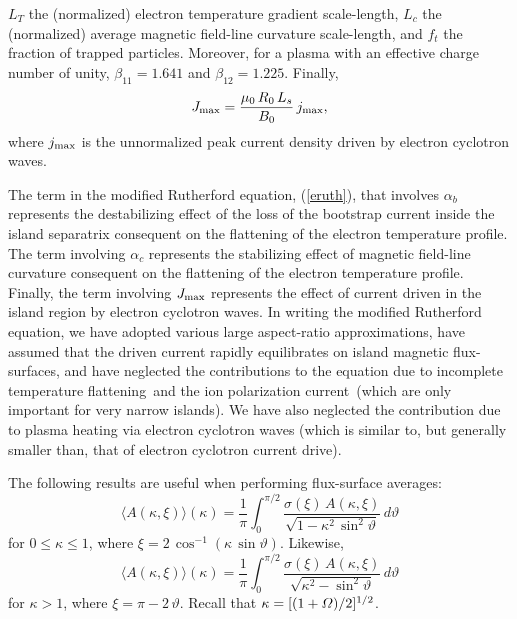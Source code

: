 \documentclass[12pt,prb,aps]{revtex4-1}
\begin{document}
$L_T$ the (normalized) electron temperature gradient scale-length, $L_c$ the (normalized) average magnetic field-line curvature scale-length, and $f_t$  the fraction of trapped particles. Moreover, for a plasma with an effective charge
number of unity, $\beta_{11}=1.641$ and $\beta_{12}= 1.225$.\cite{fitz}
Finally,
\begin{equation}\label{ecur}
J_{\rm max} = \frac{\mu_0\,R_0\,L_s}{B_0}\,j_{\rm max},
\end{equation}
where $j_{\rm max}$ is the unnormalized peak current density driven by electron cyclotron waves.  
 
 The term in the modified Rutherford equation, (\ref{eruth}),  that involves $\alpha_b$  represents  the
 destabilizing effect of the loss of the bootstrap current inside the island separatrix consequent on the flattening of the electron temperature profile. \cite{ntm2,car} The term involving $\alpha_c$ represents  the stabilizing effect of  magnetic field-line curvature  consequent on the flattening of the electron temperature profile.\cite{fitz,kot} Finally, the term involving $J_{\rm max}$ represents the effect of current driven in the island region by electron cyclotron waves.\cite{island} In writing the modified
 Rutherford equation, we have adopted various large aspect-ratio approximations,\cite{ggj1,fitz} have assumed that the driven current rapidly equilibrates on
 island magnetic flux-surfaces, 
and have  neglected the contributions to the equation due to incomplete temperature flattening\,\cite{ntm2} and the ion polarization current\,\cite{polz} (which are only important for
 very narrow islands). We  have also neglected the contribution due to
 plasma heating via electron cyclotron waves (which is similar to, but generally smaller than, that of electron cyclotron current drive).\cite{ntm4,island}
 
 The following results are useful when performing flux-surface averages:\,\cite{island}
\begin{equation}
\langle A(\kappa,\xi)\rangle(\kappa) = \frac{1}{\pi}\int_0^{\pi/2}\frac{\sigma(\xi)\,A(\kappa,\xi)}{\sqrt{1-\kappa^2\,\sin^2\vartheta}}\,d\vartheta
\end{equation}
for $0\leq \kappa\leq 1$, where $\xi=2\,\cos^{-1}(\kappa\,\sin\vartheta)$. Likewise, 
\begin{equation}
\langle A(\kappa,\xi)\rangle(\kappa) = \frac{1}{\pi}\int_0^{\pi/2}\frac{\sigma(\xi)\,A(\kappa,\xi)}{\sqrt{\kappa^2-\sin^2\vartheta}}\,d\vartheta
\end{equation}
for $\kappa>1$, where $\xi=\pi-2\,\vartheta$. Recall that $\kappa=[(1+{\mit\Omega})/2]^{1/2}$. 
\end{document}
